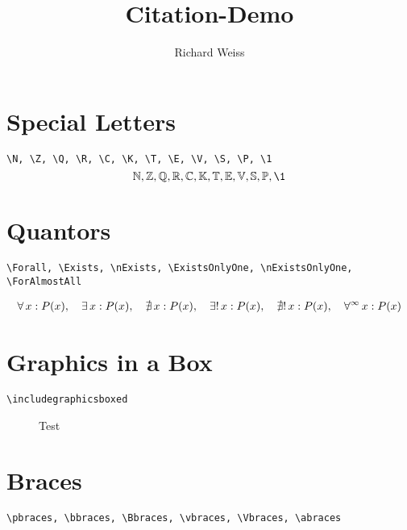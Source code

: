 \documentclass{article}
\title
{
  Citation-Demo
}
\author
{
    Richard Weiss
}
\date{}
\begin{document}
\maketitle


\section{Special Letters}

\verb|\N, \Z, \Q, \R, \C, \K, \T, \E, \V, \S, \P, \1|
$$\N, \Z, \Q, \R, \C, \K, \T, \E, \V, \S, \P, \1$$


\section{Quantors}

\verb|\Forall, \Exists, \nExists, \ExistsOnlyOne, \nExistsOnlyOne, \ForAlmostAll|

\begin{align*}
    \forall \, x: P(x),
    \quad
    \exists \, x: P(x),
    \quad
    \nexists \, x: P(x),
    \quad
    \exists! \, x: P(x),
    \quad
    \nexists! \, x: P(x),
    \quad
    \forall^\infty \, x: P(x)
\end{align*}


\section{Graphics in a Box}

\verb|\includegraphicsboxed|

\begin{figure}[h!]
    \centering
    \caption{Test}
    \label{fig:test}
\end{figure}


\section{Braces}

\verb|\pbraces, \bbraces, \Bbraces, \vbraces, \Vbraces, \abraces|
\end{document}
